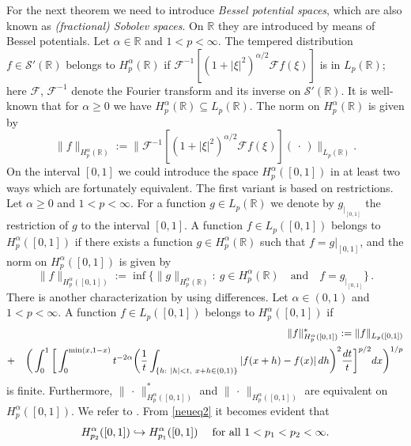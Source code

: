 \documentclass[12pt]{article}
\newcommand{\RR}{\mathbb{R}}
\newcommand{\real}{\mathbb{R}}
\newcommand{\cf}{{\mathcal{F}}}
\newcommand{\cfi}{{\mathcal{F}}^{-1}}
\newcommand{\beq}{\begin{eqnarray}}
\newcommand{\eeq}{\end{eqnarray}}
\newcommand{\red}[1]{\textcolor{red}{#1}}
\begin{document}
For the next theorem we need to introduce \emph{Bessel potential spaces}, 
which are also known as \emph{(fractional) Sobolev spaces}.
On $\real$ they are introduced by means of Bessel potentials.
Let $\alpha \in \RR$ and $1<p<\infty$. 
The tempered distribution $f\in \mathcal{S}' (\real)$
belongs to $H^\alpha _p (\real)$ if $\cfi [(1+|\xi|^2)^{\alpha/2} \cf f(\xi)]$ is in $ L_p (\real)$;
here $\cf$, $\cfi$ denote the Fourier transform and its inverse on $\mathcal{S}'(\RR)$.
It is well-known that for $\alpha \ge 0$ we have $H^\alpha _p (\real) \subseteq  L_p (\real)$. 
The norm on $H^\alpha _p (\real)$ is given by
\[
 \|f\|_{H^\alpha _p (\real)}:= \|\cfi [(1+|\xi|^2)^{\alpha/2} \cf f(\xi)](\, \cdot\, )\|_{L_p (\real)}.
\]
On the interval $[0,1]$ we could introduce the space $H^\alpha_p ([0,1])$ in at least two ways
which are fortunately equivalent.
The first variant
is based on 
restrictions.
Let $\alpha \ge 0$ and $1< p< \infty$.
For a function $g \in L_p (\real)$ we denote by $g_{|_{[0,1]}}$ the restriction of $g$ to the interval $[0,1]$. %
A function $f \in L_p ([0,1])$ belongs to $H^\alpha _p ([0,1])$
if there exists a function $g\in H^\alpha _p (\RR)$ such that $f=g|_{[0,1]}$, and the norm on
$H^\alpha _p ([0,1])$ is given by
\[
 \|f\|_{H^\alpha _p ([0,1])}:= \inf \Big\{ \|g\|_{H_p^\alpha (\real)}: ~ g \in H^\alpha_p (\real) \quad \mbox{and}\quad f=g_{|_{[0,1]}}\Big\}\, .
\]
There is another characterization by using differences. Let $\alpha \in (0,1)$ and $1<p<\infty$.
A function $f \in L_p ([0,1])$ belongs to $H^\alpha _p ([0,1])$
if 
\beq\label{neueq2}
&& \hspace*{-0.7cm}
\| f \|^*_{H^\alpha_p ([0,1])} :=  
\| f \|_{L_p ([0,1])}
\\
\nonumber
& + & \bigg(\int_{0}^1 \bigg[ \int_0^{\min(x,1-x)}   t^{-2\alpha} 
\bigg( \frac 1t \int_{\{h: ~|h|<t,~x+h \in (0,1)\}} |f(x+h)-f(x)|\, dh\bigg)^2 \frac{dt}{t}\bigg]^{p/2} dx\bigg)^{1/p}  
\eeq
is finite.
Furthermore, $\| \, \cdot \,  \|^*_{H^\alpha_p ([0,1])}$ and $\| \, \cdot \,  \|_{H^\alpha_p ([0,1])}$ are equivalent on %
$H^\alpha _p ([0,1])$. We refer to \cite[Thm.~4.10]{Tri06}. 
From \eqref{neueq2} it becomes evident that
\begin{equation}\label{monotonicity_bessel_potential_spaces}
H^\alpha _{p_2} ([0,1]) \hookrightarrow H^\alpha _{p_1} ([0,1])
\hspace{3ex}\text{for all $1<p_1 < p_2 < \infty$.}
\end{equation}
\end{document}
